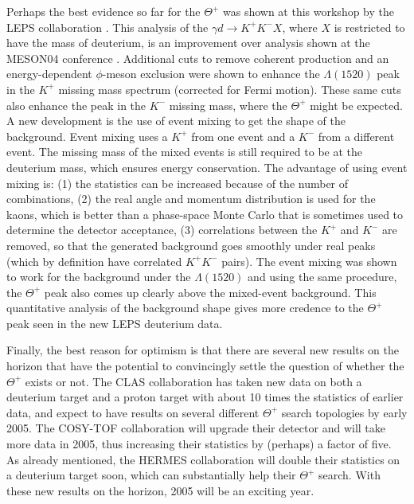 \documentclass{ws-procs9x6}
\newcommand{\thp}{$\Theta^+$ }
\begin{document}
Perhaps the best evidence so far for the \thp was shown at this 
workshop by the LEPS collaboration \cite{leps-d}.  This analysis 
of the $\gamma d \to K^+ K^- X$, where $X$ is restricted to have 
the mass of deuterium, is an improvement over analysis shown at 
the MESON04 conference \cite{meson04}.  Additional cuts to remove 
coherent production and an energy-dependent $\phi$-meson exclusion 
were shown to enhance the $\Lambda(1520)$ peak in the $K^+$ missing 
mass spectrum (corrected for Fermi motion).  These same cuts also 
enhance the peak in the $K^-$ missing mass, where the \thp might 
be expected.  A new development is the use of event mixing to get 
the shape of the background.  Event mixing uses a $K^+$ from one 
event and a $K^-$ from a different event.  The missing mass of 
the mixed events is still required to be at the deuterium mass, 
which ensures energy conservation.  The advantage of using event 
mixing is: (1) the statistics can be increased because of the 
number of combinations, (2) the real angle and momentum distribution 
is used for the kaons, which is better than a phase-space Monte 
Carlo that is sometimes used to determine the detector acceptance, 
(3) correlations between the $K^+$ and $K^-$ are removed, so that 
the generated background goes smoothly under real peaks (which 
by definition have correlated $K^+K^-$ pairs).  The event mixing 
was shown \cite{leps-d} to work for the background under the 
$\Lambda(1520)$ and using the same procedure, the \thp peak also 
comes up clearly above the mixed-event background.  This  
quantitative analysis of the background shape  gives more 
credence to the \thp peak seen in the new LEPS deuterium data.

Finally, the best reason for optimism is that there are several 
new results on the horizon that have the potential to convincingly 
settle the question of whether the \thp exists or not.  The 
CLAS collaboration has taken new data on both a deuterium target 
\cite{tedeschi} and a proton target \cite{devita} with about 10 
times the statistics of earlier data, and expect to have results 
on several different \thp search topologies by early 2005. The 
COSY-TOF collaboration \cite{eyrich} will upgrade their detector 
and will take more data in 2005, thus increasing their statistics 
by (perhaps) a factor of five.  As already mentioned, the HERMES 
collaboration will double their statistics on a deuterium target 
soon, which can substantially help their \thp search.  With these 
new results on the horizon, 2005 will be an exciting year.
\end{document}
